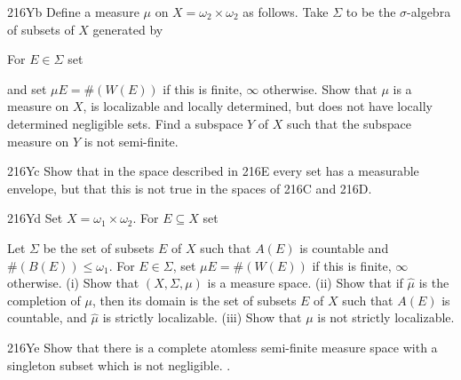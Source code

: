 {\spheader 216Yb Define a measure $\mu$ on $X=\omega_2\times\omega_2$
as follows.   Take $\Sigma$ to be the $\sigma$-algebra of subsets of $X$
generated by


\noindent For $E\in\Sigma$ set


\noindent and set $\mu E=\#(W(E))$ if this is finite, $\infty$ otherwise.
Show that $\mu$ is a measure on $X$, is localizable and locally determined,
but does not have locally determined negligible sets.   Find a subspace $Y$
of $X$ such that the subspace measure on $Y$ is not semi-finite.

\spheader 216Yc Show that in the space described in 216E every set has
a measurable envelope, but that this is not true in the spaces of 216C and 216D.

\spheader 216Yd Set $X=\omega_1\times\omega_2$.   For $E\subseteq X$ set


\ifdim\pagewidth>400pt
\Centerline{$B(E)=\{\zeta:$ there are $\xi$, $\zeta'$ such that
$\zeta<\zeta'<\omega_2$ and just one of
$(\xi,\zeta)$, $(\xi,\zeta')$ belongs to $E\}$,}
\else
$$\eqalign{B(E)
&=\{\zeta:\text{ there are }\xi,\,\zeta'\text{ such that }
\zeta<\zeta'<\omega_2\cr&
\mskip100mu\text{ and just one of }
(\xi,\zeta),\,(\xi,\zeta')\text{ belongs to }E\},
\cr}$$
\fi


\noindent Let $\Sigma$ be the set of subsets $E$ of $X$ such that $A(E)$ is
countable and $\#(B(E))\le\omega_1$.   For $E\in\Sigma$, set
$\mu E=\#(W(E))$ if this is finite, $\infty$ otherwise.   (i) Show that
$(X,\Sigma,\mu)$ is a measure space.   (ii) Show that if $\hat\mu$ is the
completion of $\mu$, then its domain is the set of subsets $E$ of $X$ such
that $A(E)$ is countable, and $\hat\mu$ is strictly localizable.   (iii)
Show that $\mu$ is not strictly localizable.

\spheader 216Ye Show that there is a
complete atomless semi-finite measure space
with a singleton subset which is not negligible.   
.

}%

